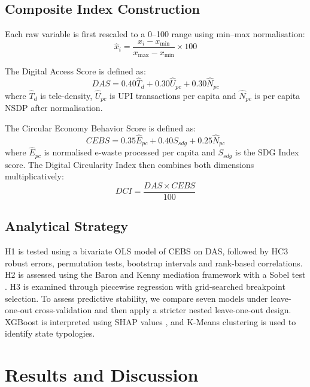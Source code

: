 \documentclass[10pt,a4paper]{article}
\begin{document}
\subsection{Composite Index Construction}

Each raw variable is first rescaled to a 0--100 range using min--max normalisation:
\begin{equation}
\hat{x}_i=\frac{x_i-x_{\min}}{x_{\max}-x_{\min}}\times 100
\end{equation}

The Digital Access Score is defined as:
\begin{equation}
DAS = 0.40\hat{T}_d + 0.30\hat{U}_{pc} + 0.30\hat{N}_{pc}
\end{equation}
where $\hat{T}_d$ is tele-density, $\hat{U}_{pc}$ is UPI transactions per capita and $\hat{N}_{pc}$ is per capita NSDP after normalisation.

The Circular Economy Behavior Score is defined as:
\begin{equation}
CEBS = 0.35\hat{E}_{pc} + 0.40S_{sdg} + 0.25\hat{N}_{pc}
\end{equation}
where $\hat{E}_{pc}$ is normalised e-waste processed per capita and $S_{sdg}$ is the SDG Index score. The Digital Circularity Index then combines both dimensions multiplicatively:
\begin{equation}
DCI=\frac{DAS \times CEBS}{100}
\end{equation}

\subsection{Analytical Strategy}

H1 is tested using a bivariate OLS model of CEBS on DAS, followed by HC3 robust errors, permutation tests, bootstrap intervals and rank-based correlations. H2 is assessed using the Baron and Kenny mediation framework with a Sobel test \citep{baron1986}. H3 is examined through piecewise regression with grid-searched breakpoint selection. To assess predictive stability, we compare seven models under leave-one-out cross-validation and then apply a stricter nested leave-one-out design. XGBoost is interpreted using SHAP values \citep{lundberg2017}, and K-Means clustering is used to identify state typologies.

\section{Results and Discussion}
\end{document}
